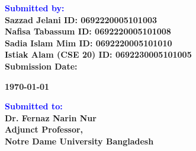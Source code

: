 \documentclass[12pt]{report}
\begin{document}
\begin{titlepage}
\begin{center}
    \vspace{1em}
    \begin{flushleft}
        \textbf{\Huge \textcolor{blue}{Submitted by:}} \\
        \vspace{0.3cm}
        \textbf{\Large Sazzad Jelani \hspace{3.9cm} ID: 0692220005101003} \\
        \vspace{0.3cm}
        \textbf{\Large Nafisa Tabassum \hspace{3cm} ID: 0692220005101008} \\
		\vspace{0.3cm}
		\textbf{\Large Sadia Islam Mim \hspace{3cm} ID: 0692220005101010} \\
		\vspace{0.3cm}        
        \textbf{\Large Istiak Alam (CSE 20) \hspace{1.9cm} ID: 0692230005101005} \\
        \vspace{0.5cm}
        \textbf{\Large Submission Date: }{\Large \textbf{\today}\par}
    \end{flushleft}
    \vfill
    \begin{flushleft}
        \textbf{\Huge \textcolor{blue}{Submitted to:}} \\
        \vspace{0.3cm}
        \textbf{\Large Dr. Fernaz Narin Nur} \\
        \vspace{0.3cm}
        \textbf{\Large Adjunct Professor,} \\
        \vspace{0.3cm}
        \textbf{\Large Notre Dame University Bangladesh}
    \end{flushleft}
\end{center}
\end{titlepage}						%
\end{document}
